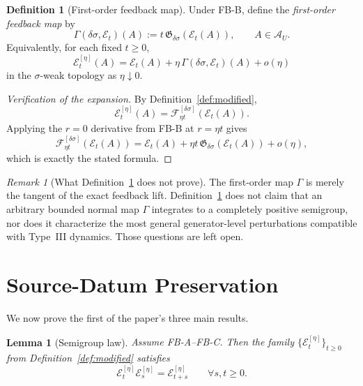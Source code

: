 \documentclass[12pt]{article}
\newtheorem{lemma}[theorem]{Lemma}
\theoremstyle{definition}
\newtheorem{definition}[theorem]{Definition}
\theoremstyle{remark}
\newtheorem{remark}[theorem]{Remark}
\begin{document}
\begin{definition}[First-order feedback map]\label{def:Gamma}
Under FB-B, define the \emph{first-order feedback map} by
\[
\Gamma(\delta\sigma,\mathcal E_t)(A)
:=
t\,\mathfrak G_{\delta\sigma}(\mathcal E_t(A)),
\qquad
A\in\mathcal A_U.
\]
Equivalently, for each fixed \(t\ge0\),
\[
\mathcal E_t^{[\eta]}(A)
=
\mathcal E_t(A)
+
\eta\,\Gamma(\delta\sigma,\mathcal E_t)(A)
+
o(\eta)
\]
in the \(\sigma\)-weak topology as \(\eta\downarrow 0\).
\end{definition}

\begin{proof}[Verification of the expansion]
By Definition~\ref{def:modified},
\[
\mathcal E_t^{[\eta]}(A)
=
\mathscr F_{\eta t}^{[\delta\sigma]}(\mathcal E_t(A)).
\]
Applying the \(r=0\) derivative from FB-B at \(r=\eta t\) gives
\[
\mathscr F_{\eta t}^{[\delta\sigma]}(\mathcal E_t(A))
=
\mathcal E_t(A)
+
\eta t\,\mathfrak G_{\delta\sigma}(\mathcal E_t(A))
+
o(\eta),
\]
which is exactly the stated formula.
\end{proof}

\begin{remark}[What Definition~\ref{def:Gamma} does not prove]
The first-order map \(\Gamma\) is merely the tangent of the exact
feedback lift. Definition~\ref{def:Gamma} does not claim that an
arbitrary bounded normal map \(\Gamma\) integrates to a completely
positive semigroup, nor does it characterize the most general
generator-level perturbations compatible with Type~III dynamics. Those
questions are left open.
\end{remark}

\section{Source-Datum Preservation}\label{sec:preservation}

We now prove the first of the paper's three main results.

\begin{lemma}[Semigroup law]\label{lem:semigroup}
Assume FB-A--FB-C. Then the family
\(\{\mathcal E_t^{[\eta]}\}_{t\ge0}\) from
Definition~\ref{def:modified} satisfies
\[
\mathcal E_t^{[\eta]}\mathcal E_s^{[\eta]}
=
\mathcal E_{t+s}^{[\eta]}
\qquad
\forall s,t\ge0.
\]
\end{lemma}
\end{document}
